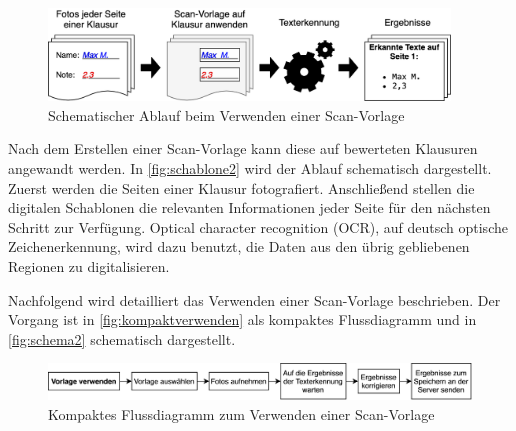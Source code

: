 \documentclass[notables, nomenclature, oneside, 150]{HSMW-Thesis}
\begin{document}
 		\begin{figure}[th]
    		\centering
    		\includegraphics[width=0.95\textwidth]{img/schablone2}
    		\caption{Schematischer Ablauf beim Verwenden einer Scan-Vorlage}
    		\label{fig:schablone2}
    	\end{figure}
 
		Nach dem Erstellen einer Scan-Vorlage kann diese auf bewerteten Klausuren angewandt werden. In \autoref{fig:schablone2} wird der Ablauf schematisch dargestellt. Zuerst werden die Seiten einer Klausur fotografiert. Anschließend stellen die digitalen Schablonen die relevanten Informationen jeder Seite für den nächsten Schritt zur Verfügung. Optical character recognition (OCR), auf deutsch optische Zeichenerkennung, wird dazu benutzt, die Daten aus den übrig gebliebenen Regionen zu digitalisieren.
    	
    	Nachfolgend wird detailliert das Verwenden einer Scan-Vorlage beschrieben. Der Vorgang ist in \autoref{fig:kompaktverwenden} als kompaktes Flussdiagramm und in \autoref{fig:schema2} schematisch dargestellt.

    	
    	\begin{figure}[th]
    		\centering
    		\includegraphics[width=\textwidth]{img/verwenden_flow_small}
    		\caption{Kompaktes Flussdiagramm zum Verwenden einer Scan-Vorlage}
    		\label{fig:kompaktverwenden}
    	\end{figure}
	
\end{document}
